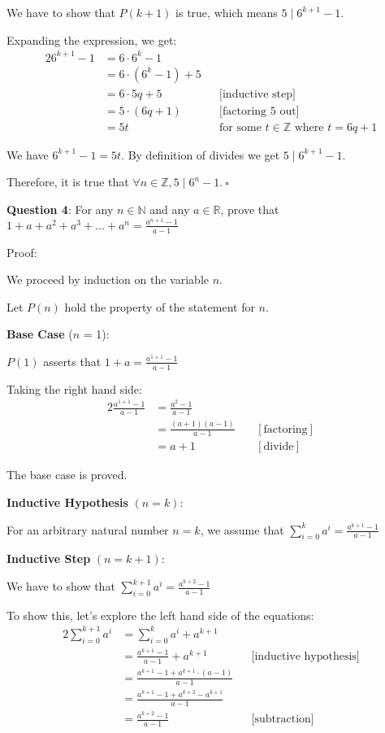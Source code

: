 \documentclass{article} %
\newcommand{\question}[2][]{\begin{flushleft}
        \textbf{Question #1}: #2

\end{flushleft}}
\begin{document}
    We have to show that $P(k + 1)$ is true, which means $5 \mid 6^{k + 1} - 1$.

    Expanding the expression, we get:
    \begin{alignat*}{2}
        6^{k + 1} - 1 &= 6 \cdot 6^k - 1 \\
        &=6 \cdot (6^k - 1) + 5\\
        &=6 \cdot 5q + 5&& \text{[inductive step]}\\
        &=5 \cdot (6q + 1)&& \text{[factoring 5 out]} \\
        &=5t&& \text{for some $t \in \mathbb{Z}$ where $t = 6q + 1$}
    \end{alignat*}

    We have  $6^{k + 1} - 1 = 5t$. By definition of divides we get  $5 \mid 6^{k + 1} - 1$.

    Therefore, it is true that $\forall n \in \mathbb{Z}, 5 \mid 6^n - 1.\ \square$ 

    \newpage

    \question[4]{For any $n \in \mathbb{N}$ and any $a \in \mathbb{R}$, prove that $1 + a + a^2 + a^3 + ... + a^n = \frac{a^{n + 1} - 1}{a - 1}$}

    Proof:

    We proceed by induction on the variable $n$.

    Let $P(n)$ hold the property of the statement for $n$.

    \textbf{Base Case} ($n$ = 1):

    $P(1)$ asserts that $1 + a = \frac{a^{1 + 1} - 1}{a-1}$

    Taking the right hand side:
    \begin{alignat*}{2}
        \frac{a^{1 + 1} - 1}{a-1} &= \frac{a^2 - 1}{a-1}\\
        &= \frac{(a+1)(a-1)}{a-1}\ && [\text{factoring}]\\
        &= a + 1&& [\text{divide}]
    \end{alignat*}

    The base case is proved.

    \textbf{Inductive Hypothesis} $(n = k)$:

    For an arbitrary natural number $n = k$, we assume that $\sum _{i = 0}^ka^i = \frac{a^{k+1} - 1}{a - 1}$

    \textbf{Inductive Step} $(n = k + 1)$:

    We have to show that $\sum _{i = 0}^{k + 1}a^i = \frac{a^{k+2} - 1}{a - 1}$

    To show this, let's explore the left hand side of the equations:
    \begin{alignat*}{2}
        \sum _{i = 0}^{k + 1}a^i &= \sum _{i = 0}^{k}a^i + a^{k + 1} \\
        &= \frac{a^{k+1} - 1}{a - 1} + a^{k + 1} &&\text{[inductive hypothesis]}\\
        &= \frac{a^{k+1} - 1 + a^{k + 1} \cdot (a - 1)}{a - 1} \\
        &= \frac{a^{k+1} - 1 + a^{k + 2} - a^{k + 1}}{a - 1} \\
        &= \frac{a^{k+2} - 1}{a - 1} &&\text{[subtraction]}\\
    \end{alignat*}
\end{document}
